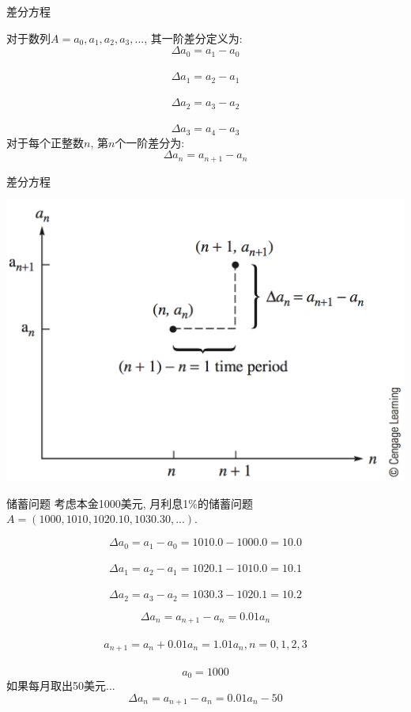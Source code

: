 \documentclass[UTF8, mathserif]{ctexbeamer}
\begin{document}
\begin{frame}{差分方程}

  \begin{definition}
    对于数列$A = {a_0, a_1, a_2, a_3, ...}$, 其一阶差分定义为:
    \[
    \Delta a_0 = a_1 - a_0
    \]\\[-20pt]
    \[
    \Delta a_1 = a_2 - a_1
    \]\\[-20pt]
    \[
    \Delta a_2 = a_3 - a_2
    \]\\[-20pt]
    \[
    \Delta a_3 = a_4 - a_3
    \]
    对于每个正整数$n$, 第$n$个一阶差分为:
    \[
    \Delta a_n = a_{n+1} - a_n
    \]
  \end{definition}
\end{frame}

\begin{frame}{差分方程}
  \begin{center}
    \includegraphics[width=.8\textwidth{}]{difference.png}
  \end{center}
\end{frame}

\begin{frame}{储蓄问题}
考虑本金1000美元, 月利息1\%的储蓄问题$A = (1000, 1010, 1020.10, 1030.30, ...)$.
\begin{block}{}
    \[
    \Delta a_0 = a_1 - a_0 = 1010.0 - 1000.0 = 10.0
    \]\\[-20pt]
    \[
    \Delta a_1 = a_2 - a_1 = 1020.1 - 1010.0 = 10.1
    \]\\[-20pt]
    \[
    \Delta a_2 = a_3 - a_2 = 1030.3 - 1020.1 = 10.2
    \]
\end{block}

\[
\Delta a_n = a_{n+1} - a_n = 0.01a_n
\]\\[-25pt]
\[
a_{n+1} = a_n + 0.01a_n = 1.01a_n, n = 0, 1, 2, 3
\]\\[-25pt]
\[
a_0 = 1000
\]
  如果每月取出50美元...
\[
\Delta a_n = a_{n+1} - a_n = 0.01a_n - 50
\]

\end{frame}
\end{document}
